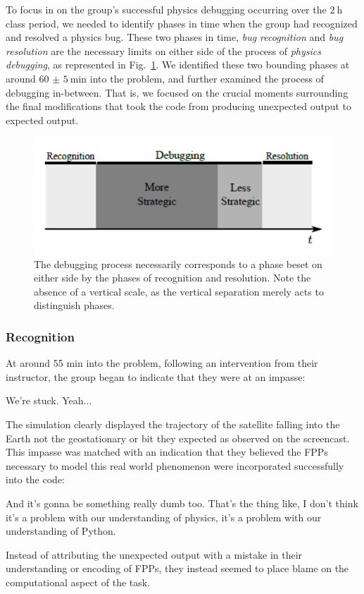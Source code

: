 \documentclass{msuphddissertation}
\begin{document}
\begin{doublespace}
To focus in on the group's successful physics debugging occurring over the $\SI{2}{\hour}$ class period, we needed to identify phases in time when the group had recognized and resolved a physics bug.  These two phases in time, \emph{bug recognition} and \emph{bug resolution} are the necessary limits on either side of the process of \emph{physics debugging}, as represented in Fig.~\ref{CH4:Strategies}.  We identified these two bounding phases at around $\SI{60(5)}{\minute}$ into the problem, and further examined the process of debugging in-between.  That is, we focused on the crucial moments surrounding the final modifications that took the code from producing unexpected output to expected output.

\begin{figure}\centering
\includegraphics[scale=1]{./images/CH4Strategies.pdf}
\caption{The debugging process necessarily corresponds to a phase beset on either side by the phases of recognition and resolution.  Note the absence of a vertical scale, as the vertical separation merely acts to distinguish phases.}\label{CH4:Strategies}
\end{figure}

\subsubsection{Recognition}

At around 55 min into the problem, following an intervention from their instructor, the group began to indicate that they were at an impasse: \begin{description}
\SB We're stuck.
\SD Yeah...\end{description} The simulation clearly displayed the trajectory of the satellite falling into the Earth not the geostationary or bit they expected as observed on the screencast. This impasse was matched with an indication that they believed the FPPs necessary to model this real world phenomenon were incorporated successfully into the code:\begin{description}
\SB And it's gonna be something really dumb too.
\SA That's the thing like, I don't think it's a problem with our understanding of physics, it's a problem with our understanding of Python.\end{description}  Instead of attributing the unexpected output with a mistake in their understanding or encoding of FPPs, they instead seemed to place blame on the computational aspect of the task.


\end{doublespace}
\end{document}
